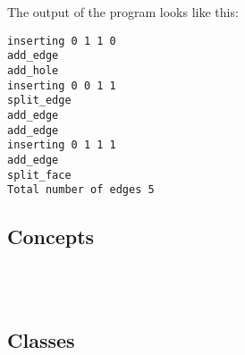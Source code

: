 \begin{ccAdvanced}

The output of the program looks like this:
\begin{verbatim}
inserting 0 1 1 0
add_edge
add_hole
inserting 0 0 1 1
split_edge
add_edge
add_edge
inserting 0 1 1 1
add_edge
split_face
Total number of edges 5
\end{verbatim}

\end{ccAdvanced}



\begin{ccTexOnly}

\subsection*{Concepts}
\\
\\

\subsection*{Classes}



\end{ccTexOnly}












